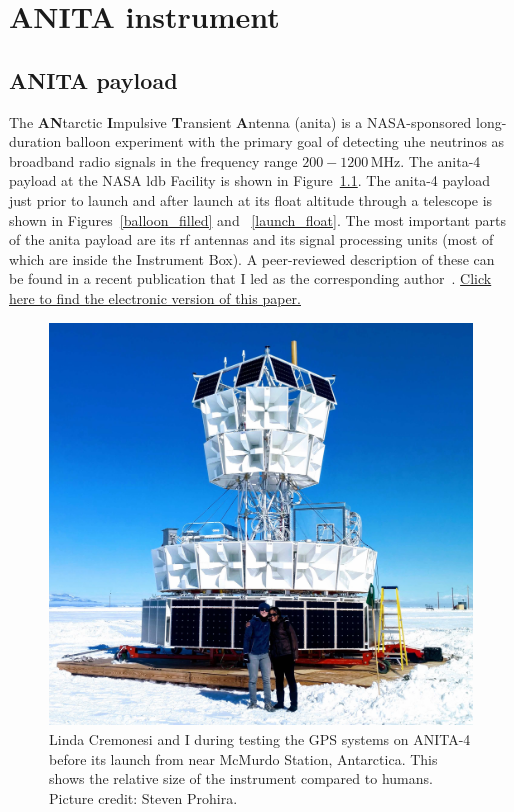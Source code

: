 \chapter{ANITA instrument}
\label{anita}

\section{ANITA payload}
\label{payload}

The {\bf AN}tarctic {\bf I}mpulsive {\bf T}ransient {\bf A}ntenna (\gls{anita}) is a NASA-sponsored long-duration balloon experiment with the primary goal of detecting \gls{uhe} neutrinos as broadband radio signals in the frequency range $200 - 1200\,\mbox{MHz}$. The \gls{anita}-4 payload at the NASA \gls{ldb} Facility is shown in Figure~\ref{my_anita}. The \gls{anita}-4 payload just prior to launch and after launch at its float altitude through a telescope is shown in Figures~\ref{balloon_filled} and ~\ref{launch_float}.
The most important parts of the \gls{anita} payload are its \gls{rf} antennas and its signal processing units (most of which are inside the Instrument Box). A peer-reviewed description of these can be found in a recent publication that I led as the corresponding author~\cite{tuff}. \href{https://www.sciencedirect.com/science/article/pii/S016890021830411X}{Click here to find the electronic version of this paper.} 

\begin{figure}
\centering
\includegraphics[width=1.0\textwidth]{figures/anita_thesis.jpg}
\caption{Linda Cremonesi and I during testing the GPS systems on ANITA-4 before its launch from near McMurdo Station, Antarctica. This shows the relative size of the instrument compared to humans. Picture credit: Steven Prohira.}
\label{my_anita}
\end{figure}

